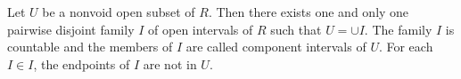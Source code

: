 Let $U$ be a nonvoid open subset of $R$. Then there exists one and only one pairwise disjoint family $I$ of open intervals of $R$ such that $U = \cup I$. The family $I$ is countable and the members of $I$ are called component intervals of $U$. For each $I \in I$, the endpoints of $I$ are not in $U$.